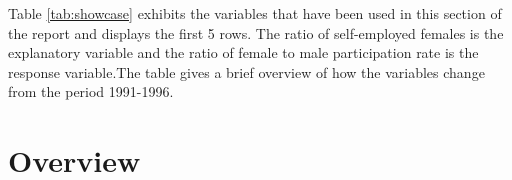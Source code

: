 \documentclass[11pt,a4paper,]{article}
\newenvironment{Shaded}{\begin{snugshade}}{\end{snugshade}}
\newcommand{\DataTypeTok}[1]{\textcolor[rgb]{0.13,0.29,0.53}{#1}}
\newcommand{\DecValTok}[1]{\textcolor[rgb]{0.00,0.00,0.81}{#1}}
\newcommand{\KeywordTok}[1]{\textcolor[rgb]{0.13,0.29,0.53}{\textbf{#1}}}
\newcommand{\NormalTok}[1]{#1}
\newcommand{\OperatorTok}[1]{\textcolor[rgb]{0.81,0.36,0.00}{\textbf{#1}}}
\newcommand{\StringTok}[1]{\textcolor[rgb]{0.31,0.60,0.02}{#1}}
\begin{document}
Table \ref{tab:showcase} exhibits the variables that have been used in this section of the report and displays the first 5 rows. The ratio of self-employed females is the explanatory variable and the ratio of female to male participation rate is the response variable.The table gives a brief overview of how the variables change from the period 1991-1996.

\begin{Shaded}
\end{Shaded}

\hypertarget{overview}{%
\section{Overview}\label{overview}}

\begin{Shaded}
\end{Shaded}
\end{document}
